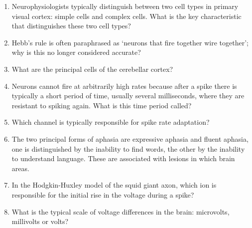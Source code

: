 \documentclass[a4paper,12pt]{article}
\newif\ifsoln
\begin{document}
\begin{enumerate} 

\item Neurophysiologists typically distinguish between two cell types in primary visual cortex: simple cells and complex cells. What is the key characteristic that distinguishes these two cell types?

\ifsoln Solution: Complex cell responses are spatially invariant to
the stimulus location, simple cell responses are not.  \fi

\item Hebb's rule is often paraphrased as \lq{}neurons that fire together wire together\rq{}; why is this no longer considered accurate?

\ifsoln Solution:  It ignores the temporal structure; spike timing effects are now considered important.\fi

\item What are the principal cells of the cerebellar cortex?

\ifsoln Solution:  Purkinje cells. \fi

\item  Neurons cannot fire at arbitrarily high rates because after a spike there is typically a short period of time, usually several milliseconds, where they are resistant to spiking again. What is this time period called? 

\ifsoln Solution:  The refractory period.\fi

\item Which channel is typically responsible for spike rate adaptation?

\ifsoln Solution:  Slow potassium. \fi

\item The two principal forms of aphasia are expressive aphasia and
  fluent aphasia, one is distinguished by the inability to find words,
  the other by the inability to understand language. These are
  associated with lesions in which brain areas.

\ifsoln Solution:  Broca's area and Wernicke's area.\fi


\item In the Hodgkin-Huxley model of the squid giant axon, which ion
  is responsible for the initial rise in the voltage during a spike?

\ifsoln Solution:  Sodium.\fi


\item What is the typical scale of voltage differences in the brain: microvolts, millivolts or volts?


\end{enumerate}
\end{document}
